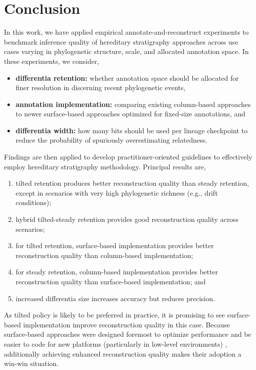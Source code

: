 \section{Conclusion} \label{sec:conclusion}

In this work, we have applied empirical annotate-and-reconstruct experiments to benchmark inference quality of hereditary stratigraphy approaches across use cases varying in phylogenetic structure, scale, and allocated annotation space.
In these experiments, we consider,
\begin{itemize}
\item \textbf{differentia retention:} whether annotation space should be allocated for finer resolution in discerning recent phylogenetic events,
\item \textbf{annotation implementation:} comparing existing column-based approaches to newer surface-based approaches optimized for fixed-size annotations, and
\item \textbf{differentia width:} how many bits should be used per lineage checkpoint to reduce the probability of spuriously overestimating relatedness.
\end{itemize}

Findings are then applied to develop practitioner-oriented guidelines to effectively employ hereditary stratigraphy methodology.
Principal results are,
\begin{enumerate}
\item tilted retention produces better reconstruction quality than steady retention, except in scenarios with very high phylogenetic richness (e.g., drift conditions);
\item hybrid tilted-steady retention provides good reconstruction quality across scenarios;
\item for tilted retention, surface-based implementation provides better reconstruction quality than column-based implementation;
\item for steady retention, column-based implementation provides better reconstruction quality than surface-based implementation; and
\item increased differentia size increases accuracy but reduces precision.
\end{enumerate}
As tilted policy is likely to be preferred in practice, it is promising to see surface-based implementation improve reconstruction quality in this case.
Because surface-based approaches were designed foremost to optimize performance and be easier to code for new platforms (particularly in low-level environments) \citep{moreno2024trackable}, additionally achieving enhanced reconstruction quality makes their adoption a win-win situation.

